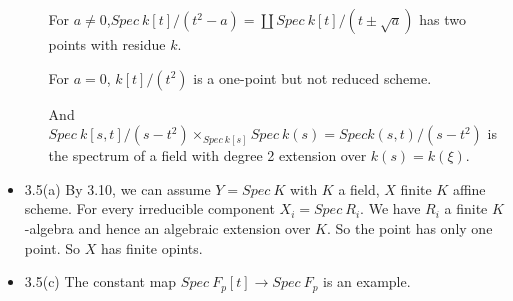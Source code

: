 \documentclass[11pt]{article}
\begin{document}
\begin{itemize}
\begin{itemize}
For $a \neq 0$,$Spec  \ k[t]/(t^2-a)= \coprod Spec  \ k[t]/(t \pm \sqrt{a})$ has two points with residue $k$.

For $a=0$, $ k[t]/(t^2)$ is a one-point but not reduced scheme.

And $Spec \ k[s,t]/(s-t^2) \times _{Spec \  k[s]} Spec  \ k(s)= Spec  k(s,t)/(s-t^2)$ is the spectrum of a field with degree 2 extension over $k(s)=k(\xi)$.
\end{itemize}
\item 3.5(a) By 3.10, we can assume $Y=Spec \  K$ with $K$ a field, $X$ finite $K$ affine scheme. For every irreducible component $X_i=Spec  \ R_i$. We have $R_i$ a finite $K$-algebra and hence an algebraic extension over $K$. So the point has only one point. So $X$ has finite opints.
\item 3.5(c) The constant map $Spec \  F_p[t] \to Spec  \ F_p$ is an example.

\end{itemize} 
 
\end{document}
